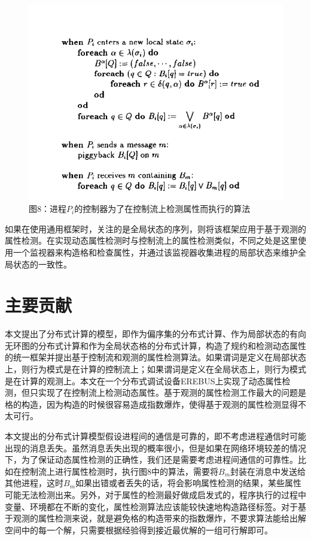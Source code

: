 \documentclass[UTF8]{article}
\begin{document}
\begin{figure}[htbp]
\centering\includegraphics[width=5in]{fig8.png}
\caption*{图8：进程$ P_i $的控制器为了在控制流上检测属性而执行的算法}
\label{fig:8}
\end{figure}
如果在使用通用框架时，关注的是全局状态的序列，则将该框架应用于基于观测的属性检测。在实现动态属性检测时与控制流上的属性检测类似，不同之处是这里使用一个监视器来构造格和检查属性，并通过该监视器收集进程的局部状态来维护全局状态的一致性。

\section{主要贡献}
本文提出了分布式计算的模型，即作为偏序集的分布式计算、作为局部状态的有向无环图的分布式计算和作为全局状态格的分布式计算，构造了规约和检测动态属性的统一框架并提出基于控制流和观测的属性检测算法。如果谓词是定义在局部状态上，则行为模式是在计算的控制流上；如果谓词是定义在全局状态上，则行为模式是在计算的观测上。本文在一个分布式调试设备EREBUS上实现了动态属性检测，但只实现了在控制流上检测动态属性。基于观测的属性检测工作最大的问题是格的构造，因为构造的时候很容易造成指数爆炸，使得基于观测的属性检测显得不太可行。

本文提出的分布式计算模型假设进程间的通信是可靠的，即不考虑进程通信时可能出现的消息丢失。虽然消息丢失出现的概率很小，但是如果在网络环境较差的情况下，为了保证动态属性检测的正确性，我们还是需要考虑进程间通信的可靠性。比如在控制流上进行属性检测时，执行图8中的算法，需要将$ B_m $封装在消息中发送给其他进程，这时$ B_m $如果出错或者丢失的话，将会影响属性检测的结果，某些属性可能无法检测出来。另外，对于属性的检测最好做成启发式的，程序执行的过程中变量、环境都在不断的变化，属性检测算法应该能较快速地构造路径标签。对于基于观测的属性检测来说，就是避免格的构造带来的指数爆炸，不要求算法能给出解空间中的每一个解，只需要根据经验得到接近最优解的一组可行解即可。

    
\end{document}
